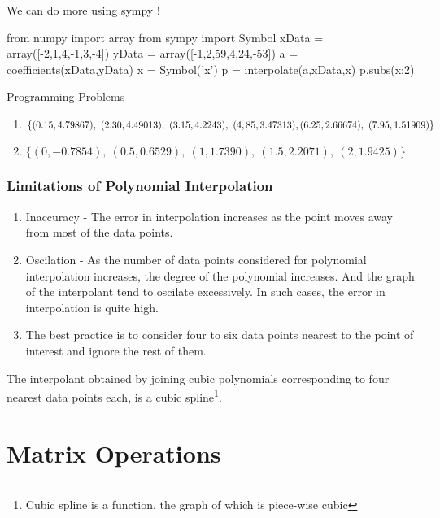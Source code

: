 \begin{program}
	We can do more using sympy !
	\begin{python}
		from numpy import array
		from sympy import Symbol
		xData = array([-2,1,4,-1,3,-4])
		yData = array([-1,2,59,4,24,-53])
		a = coefficients(xData,yData)
		x = Symbol('x')
		p = interpolate(a,xData,x)
		p.subs({x:2})
	\end{python}
\end{program}

\begin{remark}
	Programming Problems
	\begin{enumerate}
		\item $\{(0.15,4.79867),\ (2.30,4.49013),\ (3.15,4.2243),\ (4,85,3.47313),\\ (6.25,2.66674),\ (7.95,1.51909)\}$ \cite[Example 3.4]{kiusalaas}
		\item $\{(0,-0.7854),\ (0.5,0.6529),\ (1,1.7390),\ (1.5,2.2071),\ (2,1.9425)\}$\\ \cite[Problem Set 3.1.5]{kiusalaas}
	\end{enumerate}
\end{remark}
\subsection{Limitations of Polynomial Interpolation}
\begin{enumerate}
	\item Inaccuracy - The error in interpolation increases as the point moves away from most of the data points.
	\item Oscilation - As the number of data points considered for polynomial interpolation increases, the degree of the polynomial increases. And the graph of the interpolant tend to oscilate excessively. In such cases, the error in interpolation is quite high. 
	\item The best practice is to consider four to six data points nearest to the point of interest and ignore the rest of them.
\end{enumerate}
\begin{remark}
	The interpolant obtained by joining cubic polynomials corresponding to four nearest data points each, is a cubic spline\footnote{Cubic spline is a function, the graph of which is piece-wise cubic}.
\end{remark}

\chapter{Matrix Operations}

